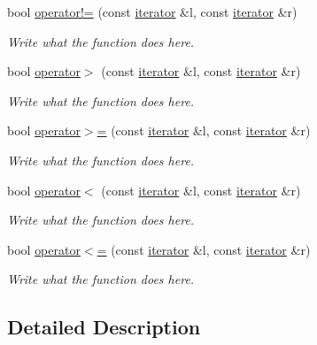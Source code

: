 \begin{DoxyCompactItemize}
bool \hyperlink{classcircularDeque_1_1iterator_aef216496a914d7abfe28c6ea6ec433ad}{operator!=} (const \hyperlink{classcircularDeque_1_1iterator}{iterator} \&l, const \hyperlink{classcircularDeque_1_1iterator}{iterator} \&r)
\begin{DoxyCompactList}\small\item\em Write what the function does here. \end{DoxyCompactList}\item 
bool \hyperlink{classcircularDeque_1_1iterator_a90290eb7089c69859452250df85a3756}{operator$>$} (const \hyperlink{classcircularDeque_1_1iterator}{iterator} \&l, const \hyperlink{classcircularDeque_1_1iterator}{iterator} \&r)
\begin{DoxyCompactList}\small\item\em Write what the function does here. \end{DoxyCompactList}\item 
bool \hyperlink{classcircularDeque_1_1iterator_ab23d72047381dab9b9888b88d4662d15}{operator$>$=} (const \hyperlink{classcircularDeque_1_1iterator}{iterator} \&l, const \hyperlink{classcircularDeque_1_1iterator}{iterator} \&r)
\begin{DoxyCompactList}\small\item\em Write what the function does here. \end{DoxyCompactList}\item 
bool \hyperlink{classcircularDeque_1_1iterator_abaee5f90fefec343d2a1bc4a7ffaa1d0}{operator$<$} (const \hyperlink{classcircularDeque_1_1iterator}{iterator} \&l, const \hyperlink{classcircularDeque_1_1iterator}{iterator} \&r)
\begin{DoxyCompactList}\small\item\em Write what the function does here. \end{DoxyCompactList}\item 
bool \hyperlink{classcircularDeque_1_1iterator_a48af46c9be3de4731ed1e9fc1aaf1421}{operator$<$=} (const \hyperlink{classcircularDeque_1_1iterator}{iterator} \&l, const \hyperlink{classcircularDeque_1_1iterator}{iterator} \&r)
\begin{DoxyCompactList}\small\item\em Write what the function does here. \end{DoxyCompactList}\end{DoxyCompactItemize}


\subsection{Detailed Description}
